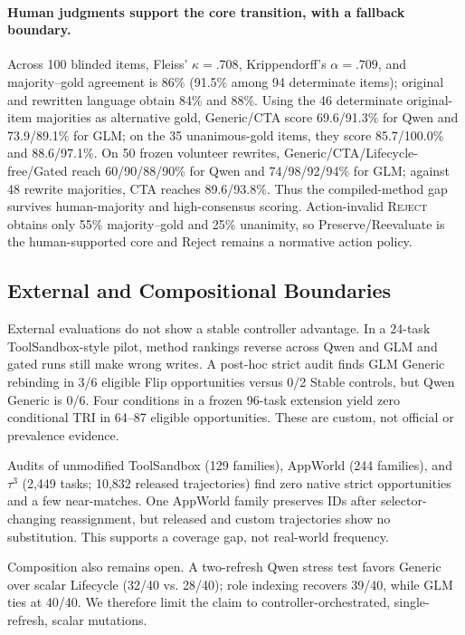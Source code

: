 \documentclass[letterpaper]{article}
\begin{document}
\paragraph{Human judgments support the core transition, with a fallback boundary.}
Across 100 blinded items, Fleiss' $\kappa=.708$, Krippendorff's $\alpha=.709$, and majority--gold
agreement is 86\% (91.5\% among 94 determinate items); original and rewritten language obtain
84\% and 88\%. Using the 46 determinate original-item majorities as alternative gold,
Generic/CTA score 69.6/91.3\% for Qwen and 73.9/89.1\% for GLM; on the 35 unanimous-gold items,
they score 85.7/100.0\% and 88.6/97.1\%. On 50 frozen volunteer rewrites,
Generic/CTA/Lifecycle-free/Gated reach 60/90/88/90\% for Qwen and 74/98/92/94\% for GLM;
against 48 rewrite majorities, CTA reaches 89.6/93.8\%. Thus the compiled-method gap survives
human-majority and high-consensus scoring. Action-invalid \textsc{Reject} obtains only 55\%
majority--gold and 25\% unanimity, so Preserve/Reevaluate is the human-supported core and Reject
remains a normative action policy.

\subsection{External and Compositional Boundaries}
External evaluations do not show a stable controller advantage. In a 24-task ToolSandbox-style
pilot, method rankings reverse across Qwen and GLM and gated runs still make wrong writes. A
post-hoc strict audit finds GLM Generic rebinding in 3/6 eligible Flip opportunities versus 0/2
Stable controls, but Qwen Generic is 0/6. Four conditions in a frozen 96-task extension yield zero
conditional TRI in 64--87 eligible opportunities. These are custom, not official or prevalence evidence.

Audits of unmodified ToolSandbox (129 families), AppWorld (244 families), and $\tau^3$ (2,449
tasks; 10,832 released trajectories) find zero native strict opportunities and a few near-matches.
One AppWorld family preserves IDs after selector-changing reassignment, but released and custom
trajectories show no substitution. This supports a coverage gap, not real-world frequency.

Composition also remains open. A two-refresh Qwen stress test favors Generic over scalar
Lifecycle (32/40 vs. 28/40); role indexing recovers 39/40, while GLM ties at 40/40. We therefore
limit the claim to controller-orchestrated, single-refresh, scalar mutations.
\end{document}
